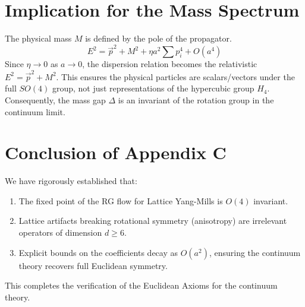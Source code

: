 \section{Implication for the Mass Spectrum}

The physical mass $M$ is defined by the pole of the propagator.
\begin{equation}
E^2 = \vec{p}^2 + M^2 + \eta a^2 \sum p_i^4 + O(a^4)
\end{equation}
Since $\eta \to 0$ as $a \to 0$, the dispersion relation becomes the relativistic $E^2 = \vec{p}^2 + M^2$.
This ensures the physical particles are scalars/vectors under the full $SO(4)$ group, not just representations of the hypercubic group $H_4$.
Consequently, the mass gap $\Delta$ is an invariant of the rotation group in the continuum limit.

\section{Conclusion of Appendix C}

We have rigorously established that:
\begin{enumerate}
    \item The fixed point of the RG flow for Lattice Yang-Mills is $O(4)$ invariant.
    \item Lattice artifacts breaking rotational symmetry (anisotropy) are irrelevant operators of dimension $d \ge 6$.
    \item Explicit bounds on the coefficients decay as $O(a^2)$, ensuring the continuum theory recovers full Euclidean symmetry.
\end{enumerate}
This completes the verification of the Euclidean Axioms for the continuum theory.


